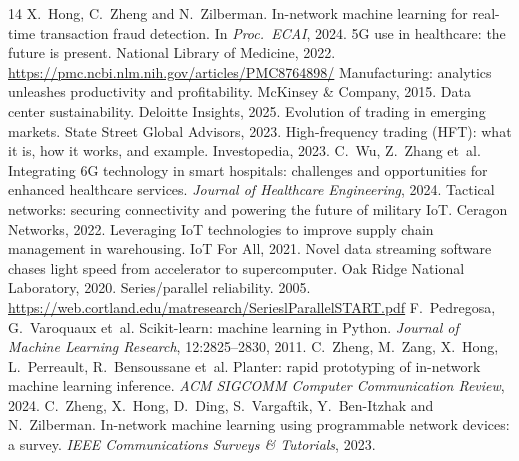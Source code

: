\documentclass[10pt,a4paper,twocolumn]{article}
\begin{document}
\small
\begin{thebibliography}{14}
\setlength{\itemsep}{1pt}
 X.~Hong, C.~Zheng and N.~Zilberman. In-network machine learning for
  real-time transaction fraud detection. In \emph{Proc.\ ECAI}, 2024.
 5G use in healthcare: the future is present. National Library of Medicine,
  2022. \url{https://pmc.ncbi.nlm.nih.gov/articles/PMC8764898/}
 Manufacturing: analytics unleashes productivity and profitability.
  McKinsey \& Company, 2015.
 Data center sustainability. Deloitte Insights, 2025.
 Evolution of trading in emerging markets. State Street Global Advisors, 2023.
 High-frequency trading (HFT): what it is, how it works, and example.
  Investopedia, 2023.
 C.~Wu, Z.~Zhang et~al. Integrating 6G technology in smart hospitals:
  challenges and opportunities for enhanced healthcare services. \emph{Journal of Healthcare
  Engineering}, 2024.
 Tactical networks: securing connectivity and powering the future of
  military IoT. Ceragon Networks, 2022.
 Leveraging IoT technologies to improve supply chain management in
  warehousing. IoT For All, 2021.
 Novel data streaming software chases light speed from accelerator to
  supercomputer. Oak Ridge National Laboratory, 2020.
 Series/parallel reliability. 2005.
  \url{https://web.cortland.edu/matresearch/SerieslParallelSTART.pdf}
 F.~Pedregosa, G.~Varoquaux et~al. Scikit-learn: machine learning in
  Python. \emph{Journal of Machine Learning Research}, 12:2825--2830, 2011.
 C.~Zheng, M.~Zang, X.~Hong, L.~Perreault, R.~Bensoussane et~al. Planter:
  rapid prototyping of in-network machine learning inference. \emph{ACM SIGCOMM Computer
  Communication Review}, 2024.
 C.~Zheng, X.~Hong, D.~Ding, S.~Vargaftik, Y.~Ben-Itzhak and N.~Zilberman.
  In-network machine learning using programmable network devices: a survey. \emph{IEEE
  Communications Surveys \& Tutorials}, 2023.
\end{thebibliography}
\end{document}
